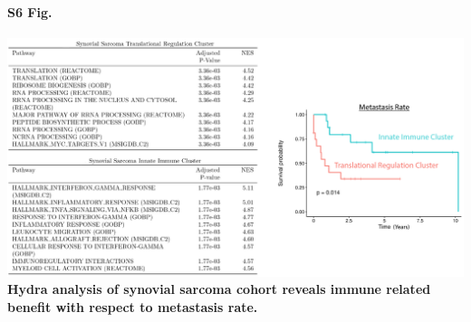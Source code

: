 \documentclass[10pt,letterpaper]{article}
\begin{document}
\paragraph*{S6 Fig.}
\includegraphics[width=\textwidth]{img/synovial-sarcoma-survival-2x}
\label{S6_Fig} {\bf Hydra analysis of synovial sarcoma cohort reveals immune related benefit with respect to metastasis rate.} 




\end{document}

